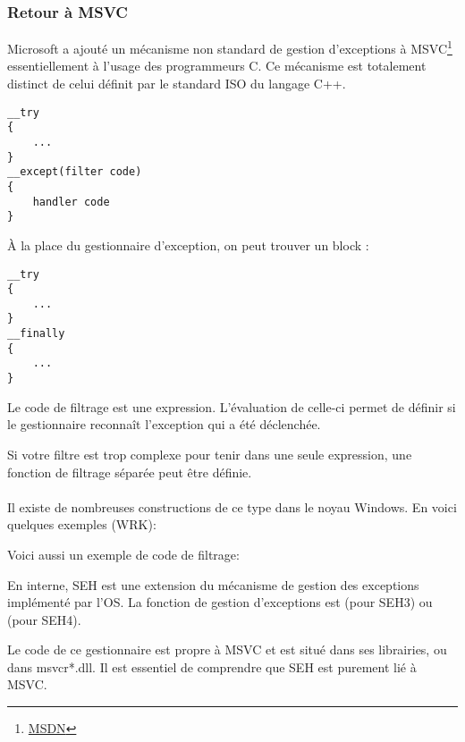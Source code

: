 ﻿\subsubsection{Retour à MSVC}


Microsoft a ajouté un mécanisme non standard de gestion d'exceptions à
MSVC\footnote{\href{http://msdn.microsoft.com/en-us/library/swezty51.aspx}{MSDN}} essentiellement à l'usage des programmeurs C.
Ce mécanisme est totalement distinct de celui définit par le standard ISO du langage C++.

\begin{lstlisting}[style=customc]
__try
{
    ...
}
__except(filter code)
{
    handler code
}
\end{lstlisting}

À la place du gestionnaire d'exception, on peut trouver un block :

\begin{lstlisting}[style=customc]
__try
{
    ...
}
__finally
{
    ...
}
\end{lstlisting}

Le code de filtrage est une expression. L'évaluation de celle-ci permet de définir si le gestionnaire
reconnaît l'exception qui a été déclenchée.

Si votre filtre est trop complexe pour tenir dans une seule expression, une fonction de filtrage
séparée peut être définie.\\
\\
Il existe de nombreuses constructions de ce type dans le noyau Windows.
En voici quelques exemples (\ac{WRK}):





Voici aussi un exemple de code de filtrage:



En interne, SEH est une extension du mécanisme de gestion des exceptions implémenté par l'OS.
La fonction de gestion d'exceptions est  (pour SEH3) ou
 (pour SEH4).

Le code de ce gestionnaire est propre à MSVC et est situé dans ses librairies, ou dans msvcr*.dll.
Il est essentiel de comprendre que SEH est purement lié à MSVC.

